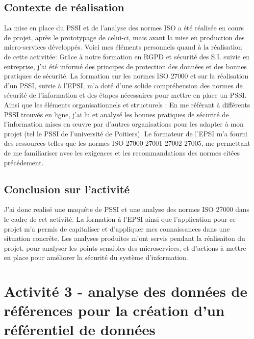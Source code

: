 \documentclass[a4paper, 11pt]{report}
\begin{document}
\subsection{Contexte de réalisation}
La mise en place du PSSI et de l'analyse des normes ISO a été réalisée en cours de projet, après le prototypage de celui-ci, mais avant la mise en production des micro-services développés.
\newline
\newline
Voici mes éléments personnels quand à la réalisation de cette activitée:
\newline
Grâce à notre formation en RGPD et sécurité des S.I. suivie en entreprise, j'ai été informé des principes de protection des données et des bonnes pratiques de sécurité.
\newline
La formation sur les normes ISO 27000 et sur la réalisation d'un PSSI, suivie à l'EPSI, m'a doté d'une solide compréhension des normes de sécurité de l'information et des étapes nécessaires pour mettre en place un PSSI.
\newline
\newline
Ainsi que les éléments organisationnels et structurels :
\newline
En me référant à différents PSSI trouvés en ligne, j'ai lu et analysé les bonnes pratiques de sécurité de l'information mises en œuvre par d'autres organisations pour les adapter à mon projet (tel le PSSI de l'université de Poitiers).
\newline
Le formateur de l'EPSI m'a fourni des ressources telles que les normes ISO 27000-27001-27002-27005, me permettant de me familiariser avec les exigences et les recommandations des normes citées précédement.
\subsection{Conclusion sur l'activité}
J'ai donc realisé une maquête de PSSI et une analyse des normes ISO 27000 dans le cadre de cet activité. La formation à l'EPSI ainsi que l'application pour ce projet m'a permis de capitaliser et d'appliquer mes connaissances dans une situation concrête.
\newline
Les analyses produites m'ont servis pendant la réalisaiton du projet, pour analyser les points sensibles des microservices, et d'actions à mettre en place pour améliorer la sécurité du système d’information.

\section{Activité 3 - analyse des données de références pour la création d'un référentiel de données}
\end{document}
